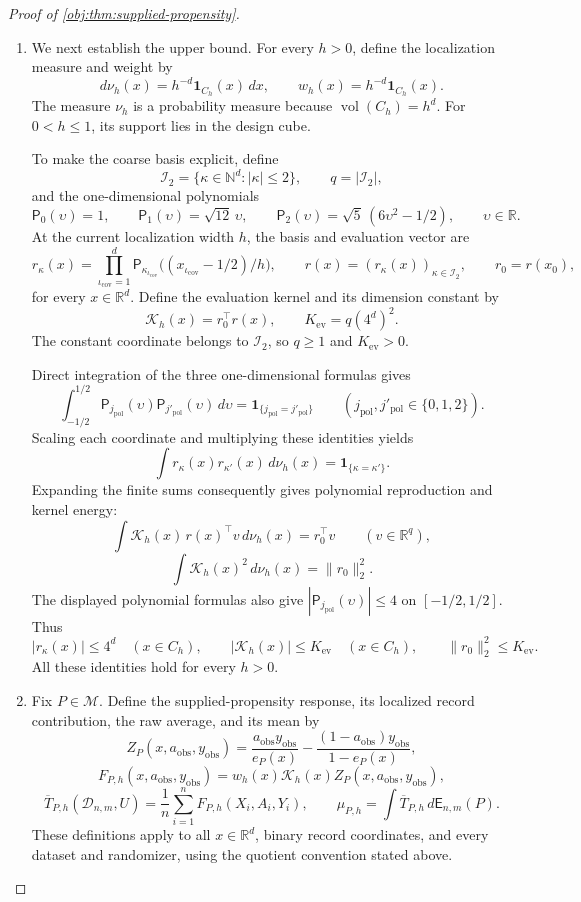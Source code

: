 \documentclass[11pt]{article}
\begin{document}
\begin{proof}[Proof of \cref{obj:thm:supplied-propensity}]
\begin{enumerate}
\item We next establish the upper bound. For every \(h>0\), define the localization measure and weight by
\[
d\nu_h(x)=h^{-d}\mathbf1_{C_h}(x)\,dx,
\qquad
w_h(x)=h^{-d}\mathbf1_{C_h}(x).
\]
The measure \(\nu_h\) is a probability measure because
\(\operatorname{vol}(C_h)=h^d\). For \(0<h\le1\), its support lies in the design cube.

To make the coarse basis explicit, define
\[
\mathcal I_2=
\{\kappa\in\mathbb N^d:|\kappa|\le2\},
\qquad
q=|\mathcal I_2|,
\]
and the one-dimensional polynomials
\[
\mathsf P_0(\upsilon)=1,\qquad
\mathsf P_1(\upsilon)=\sqrt{12}\,\upsilon,\qquad
\mathsf P_2(\upsilon)=\sqrt5\,(6\upsilon^2-1/2),
\qquad \upsilon\in\mathbb R.
\]
At the current localization width \(h\), the basis and evaluation vector are
\[
r_\kappa(x)=
\prod_{\iota_{\mathrm{cov}}=1}^d
\mathsf P_{\kappa_{\iota_{\mathrm{cov}}}}\bigl((x_{\iota_{\mathrm{cov}}}-1/2)/h\bigr),
\qquad
r(x)=(r_\kappa(x))_{\kappa\in\mathcal I_2},
\qquad
r_0=r(x_0),
\]
for every \(x\in\mathbb R^d\). Define the evaluation kernel and its dimension constant by
\[
\mathcal K_h(x)=r_0^\top r(x),
\qquad
K_{\mathrm{ev}}=q(4^d)^2.
\]
The constant coordinate belongs to \(\mathcal I_2\), so \(q\ge1\) and \(K_{\mathrm{ev}}>0\).

Direct integration of the three one-dimensional formulas gives
\[
\int_{-1/2}^{1/2}
\mathsf P_{j_{\mathrm{pol}}}(\upsilon)
\mathsf P_{j'_{\mathrm{pol}}}(\upsilon)\,d\upsilon
=
\mathbf1_{\{j_{\mathrm{pol}}=j'_{\mathrm{pol}}\}}
\qquad
(j_{\mathrm{pol}},j'_{\mathrm{pol}}\in\{0,1,2\}).
\]
Scaling each coordinate and multiplying these identities yields
\[
\int r_\kappa(x)r_{\kappa'}(x)\,d\nu_h(x)
=
\mathbf1_{\{\kappa=\kappa'\}}.
\]
Expanding the finite sums consequently gives polynomial reproduction and kernel energy:
\[
\int\mathcal K_h(x)\,r(x)^\top v\,d\nu_h(x)
=r_0^\top v
\qquad(v\in\mathbb R^q),
\]
\[
\int\mathcal K_h(x)^2\,d\nu_h(x)=\|r_0\|_2^2.
\]
The displayed polynomial formulas also give
\(|\mathsf P_{j_{\mathrm{pol}}}(\upsilon)|\le4\) on \([-1/2,1/2]\). Thus
\[
|r_\kappa(x)|\le4^d\quad(x\in C_h),
\qquad
|\mathcal K_h(x)|\le K_{\mathrm{ev}}\quad(x\in C_h),
\qquad
\|r_0\|_2^2\le K_{\mathrm{ev}}.
\]
All these identities hold for every \(h>0\).

\item Fix \(P\in\mathcal M\). Define the supplied-propensity response, its localized record contribution, the raw average, and its mean by
\[
Z_P(x,a_{\mathrm{obs}},y_{\mathrm{obs}})
=
\frac{a_{\mathrm{obs}}y_{\mathrm{obs}}}{e_P(x)}
-
\frac{(1-a_{\mathrm{obs}})y_{\mathrm{obs}}}{1-e_P(x)},
\]
\[
F_{P,h}(x,a_{\mathrm{obs}},y_{\mathrm{obs}})
=
w_h(x)\mathcal K_h(x)
Z_P(x,a_{\mathrm{obs}},y_{\mathrm{obs}}),
\]
\[
\overline T_{P,h}(\mathcal D_{n,m},U)
=
\frac1n\sum_{i=1}^nF_{P,h}(X_i,A_i,Y_i),
\qquad
\mu_{P,h}
=
\int\overline T_{P,h}\,d\mathsf E_{n,m}(P).
\]
These definitions apply to all \(x\in\mathbb R^d\), binary record coordinates, and every dataset and randomizer, using the quotient convention stated above.


\end{enumerate}
\end{proof}
\end{document}
